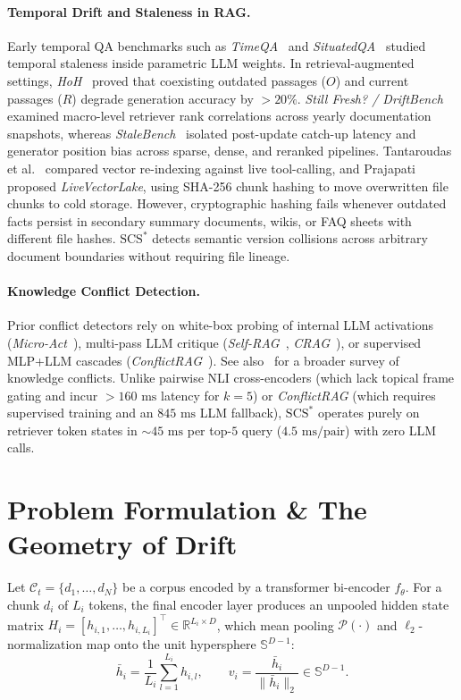 \documentclass[11pt,a4paper]{article}
\theoremstyle{definition}
\newcommand{\SCS}{\mathrm{SCS}^*}
\begin{document}
\paragraph{Temporal Drift and Staleness in RAG.} Early temporal QA benchmarks such as \emph{TimeQA}~\cite{chen2021timeqa} and \emph{SituatedQA}~\cite{zhang2021situatedqa} studied temporal staleness inside parametric LLM weights. In retrieval-augmented settings, \emph{HoH}~\cite{ouyang2025hoh} proved that coexisting outdated passages ($O$) and current passages ($R$) degrade generation accuracy by $>20\%$. \emph{Still Fresh? / DriftBench}~\cite{stillfresh2026} examined macro-level retriever rank correlations across yearly documentation snapshots, whereas \emph{StaleBench}~\cite{singh2026stalebench} isolated post-update catch-up latency and generator position bias across sparse, dense, and reranked pipelines. Tantaroudas et al.~\cite{tantaroudas2026after} compared vector re-indexing against live tool-calling, and Prajapati~\cite{prajapati2026livevectorlake} proposed \emph{LiveVectorLake}, using SHA-256 chunk hashing to move overwritten file chunks to cold storage. However, cryptographic hashing fails whenever outdated facts persist in secondary summary documents, wikis, or FAQ sheets with different file hashes. $\SCS$ detects semantic version collisions across arbitrary document boundaries without requiring file lineage.

\paragraph{Knowledge Conflict Detection.} Prior conflict detectors rely on white-box probing of internal LLM activations (\emph{Micro-Act}~\cite{microact2025}), multi-pass LLM critique (\emph{Self-RAG}~\cite{asai2024selfrag}, \emph{CRAG}~\cite{yan2024crag}), or supervised MLP+LLM cascades (\emph{ConflictRAG}~\cite{wang2026conflictrag}). See also~\cite{xu2024knowledgeconflicts} for a broader survey of knowledge conflicts. Unlike pairwise NLI cross-encoders (which lack topical frame gating and incur $>160\text{ ms}$ latency for $k=5$) or \emph{ConflictRAG} (which requires supervised training and an $845\text{ ms}$ LLM fallback), $\SCS$ operates purely on retriever token states in $\sim 45\text{ ms}$ per top-$5$ query ($4.5\text{ ms/pair}$) with zero LLM calls.

\section{Problem Formulation \& The Geometry of Drift}
Let $\mathcal{C}_t = \{d_1, \dots, d_N\}$ be a corpus encoded by a transformer bi-encoder $f_\theta$. For a chunk $d_i$ of $L_i$ tokens, the final encoder layer produces an unpooled hidden state matrix $H_i = [h_{i,1}, \dots, h_{i,L_i}]^\top \in \mathbb{R}^{L_i \times D}$, which mean pooling $\mathcal{P}(\cdot)$ and $\ell_2$-normalization map onto the unit hypersphere $\mathbb{S}^{D-1}$:
\begin{equation}
\bar{h}_i = \frac{1}{L_i} \sum_{l=1}^{L_i} h_{i,l}, \qquad v_i = \frac{\bar{h}_i}{\|\bar{h}_i\|_2} \in \mathbb{S}^{D-1}.
\end{equation}
\end{document}
